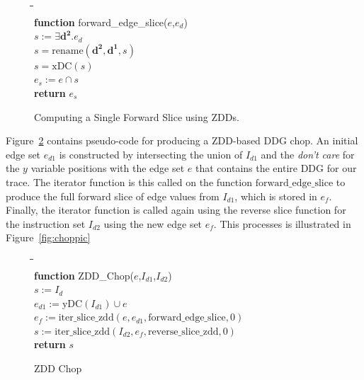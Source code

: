 \documentclass[defaultstyle,11pt]{thesis}
\begin{document}
\begin{figure}
\begin{center}
\begin{minipage}{1.5in}
\begin{tabbing}
\hspace{1em}\=\hspace{1em}\=\hspace{1em}\=\hspace{1em}\=\\
\textbf{function} forward\_edge\_slice($e$,$e_d$)\\
\>$s := \exists \mathbf{d^2}.e_d$\\
\>$s = \mathrm{rename}(\mathbf{d^2},\mathbf{d^1},s)$\\
\>$s = \mathrm{xDC}(s)$\\
\>$e_s := e \cap s$\\
\>\textbf{return} $e_s$
\end{tabbing}
\end{minipage}
\end{center}
\caption{Computing a Single Forward Slice using ZDDs.}
\label{fig:forwardedgeslice}
\end{figure}

Figure~\ref{fig:zddchop} contains pseudo-code for producing a
ZDD-based DDG chop.  An initial edge set $e_{d1}$ is constructed by
intersecting the union of $I_{d1}$ and the \textit{don't care} for the
$y$ variable positions with the edge set $e$ that contains the entire
DDG for our trace.  The iterator function is this called on the
function $\mathrm{forward\_edge\_slice}$ to produce the full forward
slice of edge values from $I_{d1}$, which is stored in $e_f$.
Finally, the iterator function is called again using the reverse slice
function for the instruction set $I_{d2}$ using the new edge set
$e_f$.  This processes is illustrated in Figure~\ref{fig:choppic}

\begin{figure}
\begin{center}
\begin{minipage}{1.5in}
\begin{tabbing}
\hspace{1em}\=\hspace{1em}\=\hspace{1em}\=\hspace{1em}\=\\
\textbf{function} ZDD\_Chop($e$,$I_{d1}$,$I_{d2}$)\\
\>$s := I_d$\\
\>$e_{d1} := \mathrm{yDC}(I_{d1}) \cup e$\\
\>$e_f := \mathrm{iter\_slice\_zdd}(e, e_{d1},\mathrm{forward\_edge\_slice},0)$\\
\>$s :=\mathrm{iter\_slice\_zdd}(I_{d2}, e_{f},\mathrm{reverse\_slice\_zdd},0)$\\
\>\textbf{return} $s$
\end{tabbing}
\end{minipage}
\end{center}
\caption{ZDD Chop}
\label{fig:zddchop}
\end{figure}
\end{document}

